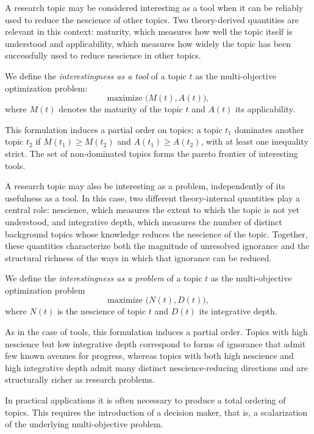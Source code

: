A research topic may be considered interesting as a tool when it can be reliably used to reduce the nescience of other topics. Two theory-derived quantities are relevant in this context: maturity, which measures how well the topic itself is understood and applicability, which measures how widely the topic has been successfully used to reduce nescience in other topics.

\begin{definition}
We define the \emph{interestingness as a tool} of a topic $t$ as the multi-objective optimization problem:
\[
\text{maximize } \bigl( M(t), A(t) \bigr),
\]
where $M(t)$ denotes the maturity of the topic $t$ and $A(t)$ its applicability.
\end{definition}

This formulation induces a partial order on topics: a topic $t_1$ dominates another topic $t_2$ if $M(t_1) \ge M(t_2)$ and $A(t_1) \ge A(t_2)$, with at least one inequality strict. The set of non-dominated topics forms the pareto frontier of interesting tools.

A research topic may also be interesting as a problem, independently of its usefulness as a tool. In this case, two different theory-internal quantities play a central role: nescience, which measures the extent to which the topic is not yet understood, and integrative depth, which measures the number of distinct background topics whose knowledge reduces the nescience of the topic. Together, these quantities characterize both the magnitude of unresolved ignorance and the structural richness of the ways in which that ignorance can be reduced. 

\begin{definition}
We define the \emph{interestingness as a problem} of a topic $t$ as the multi-objective optimization problem
\[
\text{maximize } \bigl( N(t), D(t) \bigr),
\]
where $N(t)$ is the nescience of topic $t$ and $D(t)$ its integrative depth.
\end{definition}

As in the case of tools, this formulation induces a partial order. Topics with high nescience but low integrative depth correspond to forms of ignorance that admit few known avenues for progress, whereas topics with both high nescience and high integrative depth admit many distinct nescience-reducing directions and are structurally richer as research problems.

In practical applications it is often necessary to produce a total ordering of topics. This requires the introduction of a decision maker, that is, a scalarization of the underlying multi-objective problem.

